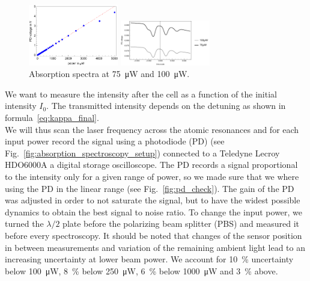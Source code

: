 \begin{figure}
    \includegraphics[width=0.35\textwidth]{pd_check}    
    \caption{\label{fig:pd_check} Maximum PD voltage taken out of atomic resonance 
    over power measured before the cell to ensure PD linearity; measurements at 
    \SI{4000}{\micro\watt} and \SI{5000}{\micro\watt} will be excluded.}
    \vspace{2em}
    \includegraphics[width=0.35\textwidth]{power_compare}    
    \caption{\label{fig:power_compare} Absorption spectra at \SI{75}{\micro\watt}
    and \SI{100}{\micro\watt}.}
\end{figure}
We want to measure the intensity after the cell as a function of the initial
intensity \(I_0\). The transmitted intensity depends on the detuning as shown in
formula~\ref{eq:kappa_final}. \\
We will thus scan the laser frequency across the atomic resonances and for each 
input power record the signal using a photodiode (PD) 
(see Fig.~\ref{fig:absorption_spectroscopy_setup}) connected to a Teledyne Lecroy 
HDO6000A a digital storage oscilloscope. The PD records a signal 
proportional to the intensity only for a given range of power, so we made sure 
that we where using the PD in the linear range (see Fig.~\ref{fig:pd_check}). The
gain of the PD was adjusted in order to not saturate the signal, but to have the
widest possible dynamics to obtain the best signal to noise ratio. To 
change the input power, we turned the \(\lambda/2\) plate before the polarizing 
beam splitter (PBS) and measured it before every spectroscopy. It should be noted 
that changes of the sensor position in between measurements and variation of the
remaining ambient light lead to an increasing uncertainty at lower beam power. 
We account for \SI{10}{\percent} uncertainty below \SI{100}{\micro\watt}, 
\SI{8}{\percent} below \SI{250}{\micro\watt}, \SI{6}{\percent} below 
\SI{1000}{\micro\watt} and \SI{3}{\percent} above.\\
